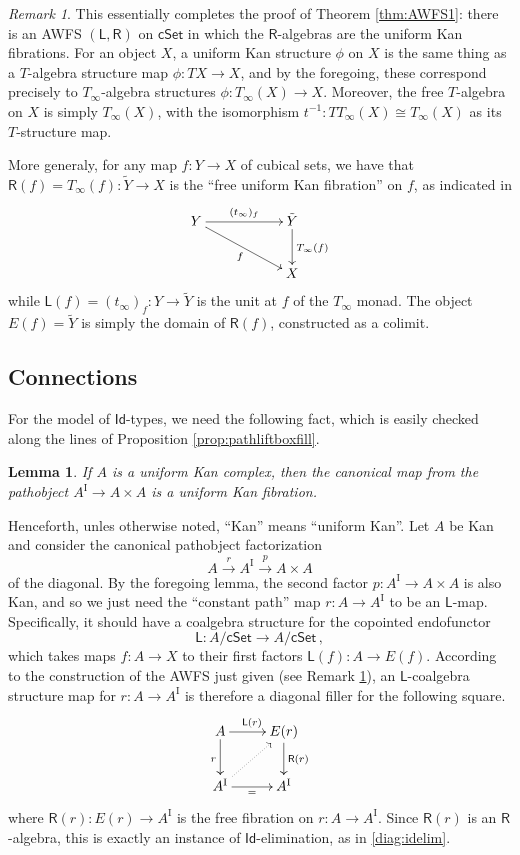\documentclass[12pt]{article}
\newcommand{\cSet}{\ensuremath{\mathsf{cSet}}}
\newcommand{\LL}{\ensuremath{\mathsf{L}}}
\newcommand{\RR}{\ensuremath{\mathsf{R}}}
\newcommand{\Tinf}{\ensuremath{T_\infty}}
\newcommand{\I}{\ensuremath{\mathrm{I}}}
\newcommand{\Id}{\ensuremath{\mathsf{Id}}}
\newtheorem{lemma}[theorem]{Lemma}
\theoremstyle{remark}
\newtheorem{remark}[theorem]{Remark}
\theoremstyle{definition}
\begin{document}
\begin{remark}\label{rem:AWFS1}
This essentially completes the proof of Theorem \ref{thm:AWFS1}: there is an AWFS $(\LL,\RR)$ on $\cSet$ in which the $\RR$-algebras are the uniform Kan fibrations.  For an object $X$, a uniform Kan structure $\phi$ on $X$ is the same thing as a $T$-algebra structure map $\phi : TX\to X$, and by the foregoing, these correspond precisely to $\Tinf$-algebra structures $\phi:\Tinf(X) \to X$.  Moreover, the free $T$-algebra on $X$ is simply $\Tinf(X)$, with the isomorphism $t^{-1} : T\Tinf(X) \cong \Tinf(X)$ as its $T$-structure map.

More generaly, for any map $f:Y\to X$ of cubical sets, we have that  $\RR(f) = \Tinf(f) : \tilde{Y} \to X$ is the ``free uniform Kan fibration'' on $f$, as indicated in
\begin{equation}%
\xymatrix{
Y \ar[rrd]_{f} \ar[rr]^{(t_\infty)_f} && \ar[d]^{\Tinf(f)} \tilde{Y} \\
&& X
}
\end{equation}
while $\LL(f) = (t_\infty)_f : Y \to \tilde{Y}$ is the unit at $f$ of the $\Tinf$ monad.  The object $E(f) = \tilde{Y}$ is simply the domain of $\RR(f)$, constructed as a colimit.
\end{remark}

\subsection{Connections}

For the model of \Id-types, we need the following fact, which is easily checked along the lines of Proposition \ref{prop:pathliftboxfill}.

\begin{lemma}
If $A$ is a uniform Kan complex, then the canonical map from the pathobject $A^\I \to A\times A$ is a uniform Kan fibration.
\end{lemma}

Henceforth, unles otherwise noted, ``Kan'' means ``uniform Kan''.
Let $A$ be Kan and consider the canonical pathobject factorization $$A\stackrel{r}{\to} A^\I \stackrel{p}{\to} A\times A$$ of the diagonal.  By the foregoing lemma, the second factor $p : A^\I \to A\times A$ is also Kan, and so we just need the ``constant path'' map $r : A \to A^\I$ to be an $\LL$-map.  Specifically, it should have a coalgebra structure for the copointed endofunctor
\[
\LL : A/\cSet \longrightarrow A/\cSet\,,
\]
which takes maps $f : A\to X$ to their first factors $\LL(f): A \to E(f)$.  According to the construction of the AWFS just given (see Remark \ref{rem:AWFS1}), an $\LL$-coalgebra structure map for $r:A\to A^\I$ is therefore a diagonal filler for the following square.
\begin{equation}\label{diagram:reflL}
\xymatrix{
A \ar[d]_{r} \ar[r]^{\LL(r)} & \ar[d]^{\RR(r)} E(r) \\
A^\I \ar@{..>}[ru] \ar[r]_{=} & A^\I
}
\end{equation}
where $\RR(r):E(r) \to A^\I$ is the free fibration on $r : A \to A^\I$.  Since $\RR(r)$ is an $\RR$-algebra, this is exactly an instance of \Id-elimination, as in \eqref{diag:idelim}.
\end{document}
